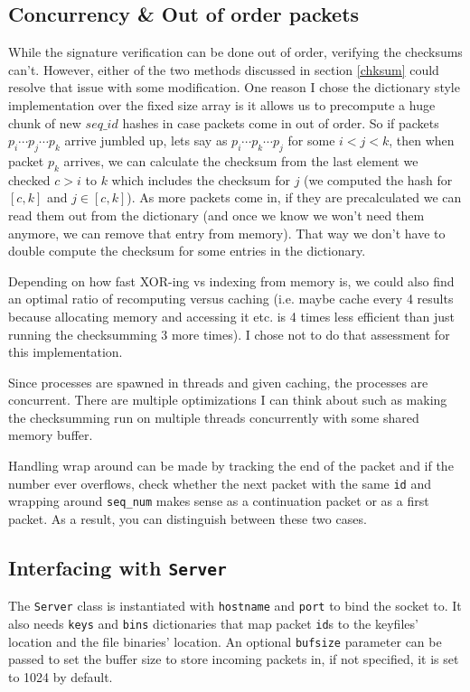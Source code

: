 \documentclass[acmtog,review]{acmart}
\begin{document}
\subsection{Concurrency \& Out of order packets}
\label{concurrency}

While the signature verification can be done out of order,
verifying the checksums can't. However, either of the 
two methods discussed in section \ref{chksum} could resolve
that issue with some modification. One reason I chose the
dictionary style implementation over the fixed size array
is it allows us to precompute a huge chunk of new $seq\_id$
hashes in case packets come in out of order. So if packets
$p_i \cdots p_j \cdots p_k$ arrive jumbled up, lets say
as $p_i \cdots p_k \cdots p_j$ for some $i<j<k$, then when 
packet $p_k$ arrives, we can calculate the checksum from
the last element we checked $c > i$ to $k$ which includes
the checksum for $j$ (we computed the hash for $[c, k]$ and 
$j \in [c, k]$). As more packets come in, if they are 
precalculated we can read them out from the dictionary
(and once we know we won't need them anymore, we can
remove that entry from memory). That way we don't have to
double compute the checksum for some entries in the dictionary.

Depending on how fast XOR-ing vs indexing from memory is,
we could also find an optimal ratio of recomputing
versus caching (i.e. maybe cache every 4 results because
allocating memory and accessing it etc. is 4 times less
efficient than just running the checksumming 3 more times).
I chose not to do that assessment for this implementation.

Since processes are spawned in threads and given caching,
the processes are concurrent. There are multiple optimizations
I can think about such as making the checksumming run on multiple
threads concurrently with some shared memory buffer.

Handling wrap around can be made by tracking the end of the packet
and if the number ever overflows, check whether the next packet
with the same \texttt{id} and wrapping around \texttt{seq\_num}
makes sense as a continuation packet or as a first packet. As
a result, you can distinguish between these two cases.

\subsection{Interfacing with \texttt{Server}}

The \texttt{Server} class is instantiated with \texttt{hostname}
and \texttt{port} to bind the socket to. It also needs
\texttt{keys} and \texttt{bins} dictionaries that map packet
\texttt{id}s to the keyfiles' location and the file binaries' location.
An optional \texttt{bufsize} parameter can be passed to set
the buffer size to store incoming packets in, if not specified,
it is set to 1024 by default.
\end{document}

